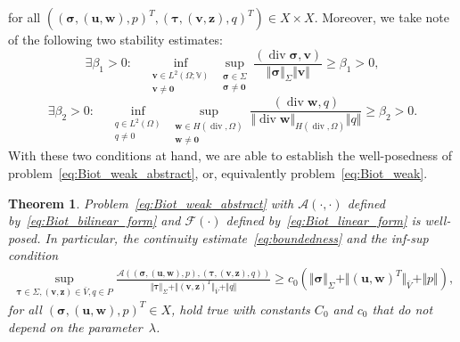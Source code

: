 \documentclass[11pt]{amsart}
\newtheorem{theorem}{Theorem}
\theoremstyle{remark}
\theoremstyle{definition}
\def\sig{{\bm \sigma}}
\def\btau{{\bm \tau}}
\def\bu{{\boldsymbol u}}
\def\bv{{\boldsymbol v}}
\def\bw{{\boldsymbol w}}
\renewcommand{\div}{\operatorname{div}}
\renewcommand{\div}{\operatorname{div}}
\def\sig{\boldsymbol \sigma}
\def\bu{\boldsymbol u}
\def\bv{\boldsymbol v}
\def\bw{\boldsymbol w}
\def\bz{\boldsymbol z}
\begin{document}
%
for all $((\sig,(\bu,\bw),p)^T, (\bm \tau,(\bv,\bz),q)^T) \in X \times X$.
%
Moreover, we take note of the following two stability estimates:
\begin{equation}\label{eq:inf_sup_sigma_v}
\exists \beta_1 > 0: \quad \inf_{\substack{\bv \in L^2(\Omega;\mathbb{V}) \\ \bv \neq \bm 0}} \sup_{\substack{\sig \in \Sigma \\ \sig \neq \bm 0}} 
\frac{(\div \sig,\bv)}{\Vert \sig \Vert_\Sigma \Vert \bv \Vert} \ge \beta_1 > 0 ,
\end{equation} 
\begin{equation}\label{eq:inf_sup_w_q}
\exists \beta_2 > 0: \quad \inf_{\substack{q \in L^2(\Omega) \\ q \neq 0}} \sup_{\substack{\bm w \in H(\div,\Omega) \\ \bm w \neq \bm 0}} 
\frac{(\div \bm w,q)}{\Vert \div \bm w \Vert_{H(\div,\Omega)} \Vert q \Vert} \ge \beta_2 > 0 .
\end{equation} 
%
With these two conditions at hand, we are able to establish the well-posedness of problem~\eqref{eq:Biot_weak_abstract}, or, equivalently problem~\eqref{eq:Biot_weak}. 
%
\begin{theorem}\label{thm:well-posedness}
Problem~\eqref{eq:Biot_weak_abstract} with $\mathcal A (\cdot,\cdot)$ defined by~\eqref{eq:Biot_bilinear_form}
and $\mathcal F (\cdot)$ defined by~\eqref{eq:Biot_linear_form} is well-posed.
{
In particular, the continuity estimate~\eqref{eq:boundedness} and the inf-sup condition 
\begin{align}
\sup_{\btau \in \Sigma, (\bv,\bz)\in \bar{V}, q\in P}\frac{\mathcal A ((\sig,(\bu,\bw),p),(\btau,(\bv,\bz),q))}{\Vert \btau \Vert_\Sigma + \Vert (\bv,\bz)^T \Vert_{\bar{V}} + \Vert q \Vert}\ge c_0\left(\Vert \sig \Vert_\Sigma + \Vert (\bu,\bw)^T \Vert_{\bar{V}} + \Vert p \Vert\right),
\end{align}
{ for all  $(\sig,(\bu,\bw),p)^T \in X$},
hold true with constants $C_0$ and $c_0$ that do not depend on the parameter~$\lambda$. 
}
\end{theorem}
\end{document}
